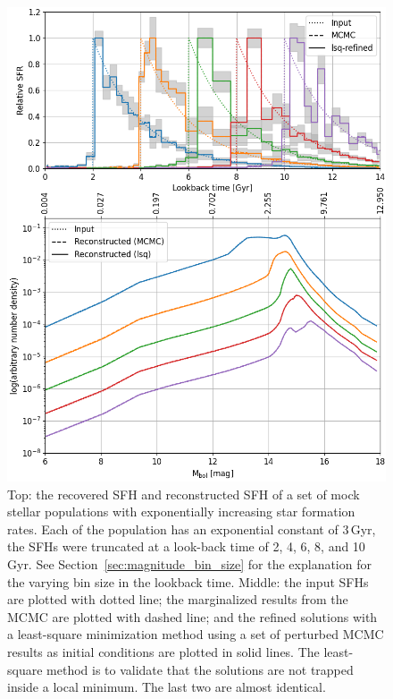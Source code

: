 \documentclass[fleqn,usenatbib]{mnras}
\begin{document}
\begin{figure}
  \includegraphics[width=\columnwidth]{figures/fig_01_exponential_decay_wdlf.png}
  \caption{Top: the recovered SFH and reconstructed SFH of a set of mock stellar
  populations with exponentially increasing star formation rates. Each of
  the population has an exponential constant of 3\,Gyr, the SFHs were truncated
  at a look-back time of 2, 4, 6, 8, and 10\,Gyr. See 
  Section~\ref{sec:magnitude_bin_size} for the explanation for the varying bin
  size in the lookback time. Middle: the input SFHs are plotted with dotted
  line; the marginalized results from the MCMC are plotted with dashed line;
  and the refined solutions with a least-square minimization method using a set
  of perturbed MCMC results as initial conditions are plotted in solid lines.
  The least-square method is to validate that the solutions are not trapped
  inside a local minimum. The last two are almost identical.}
  \label{fig:exponential_sfh}
\end{figure}

\end{document}
